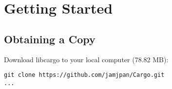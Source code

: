 \section{Getting Started}

\subsection{Obtaining a Copy}

Download libcargo to your local computer (78.82 MB):
\begin{verbatim}
git clone https://github.com/jamjpan/Cargo.git
...
\end{verbatim}


